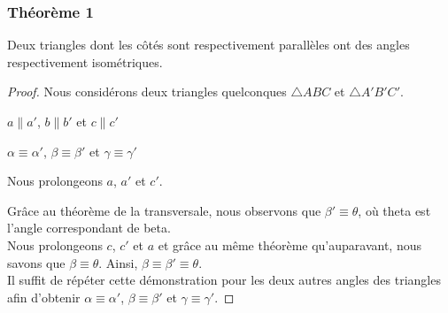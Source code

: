 \documentclass[a4paper,12pt]{article}
\begin{document}
\subsubsection{Théorème 1}
\begin{theorem}
Deux triangles dont les côtés sont respectivement parallèles ont des angles respectivement isométriques.
\end{theorem}

\begin{proof}
Nous considérons deux triangles quelconques $\triangle ABC$ et $\triangle A'B'C'$.


\begin{hyp}
$a \parallel a'$, $b \parallel b'$ et $c \parallel c'$
\end{hyp}
\begin{concl}
$\alpha \equiv \alpha'$, $\beta \equiv \beta'$ et $\gamma \equiv \gamma'$
\end{concl}
Nous prolongeons $a$, $a'$ et $c'$. 


Grâce au théorème de la transversale, nous observons que $\beta' \equiv \theta$, où theta est l'angle correspondant de beta.\\
Nous prolongeons $c$, $c'$ et $a$ et grâce au même théorème qu'auparavant, nous savons que $\beta \equiv \theta$.
Ainsi, $\beta \equiv \beta' \equiv \theta$.\\
Il suffit de répéter cette démonstration pour les deux autres angles des triangles afin d'obtenir $\alpha \equiv \alpha'$, $\beta \equiv \beta'$ et $\gamma \equiv \gamma'$.


\end{proof}
\end{document}
